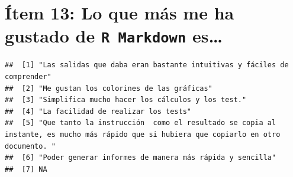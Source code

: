 \documentclass[
]{article}
\newenvironment{Shaded}{\begin{snugshade}}{\end{snugshade}}
\newcommand{\CommentTok}[1]{\textcolor[rgb]{0.56,0.35,0.01}{\textit{#1}}}
\newcommand{\NormalTok}[1]{#1}
\newcommand{\SpecialCharTok}[1]{\textcolor[rgb]{0.81,0.36,0.00}{\textbf{#1}}}
\begin{document}
\hypertarget{uxedtem-13-lo-que-muxe1s-me-ha-gustado-de-es}{%
\section{\texorpdfstring{Ítem 13: Lo que más me ha gustado de
\texttt{R Markdown}
es\ldots{}}{Ítem 13: Lo que más me ha gustado de  es\ldots{}}}\label{uxedtem-13-lo-que-muxe1s-me-ha-gustado-de-es}}

\begin{Shaded}
\end{Shaded}

\begin{verbatim}
##  [1] "Las salidas que daba eran bastante intuitivas y fáciles de comprender"                                                                                                                                                                                                      
##  [2] "Me gustan los colorines de las gráficas"                                                                                                                                                                                                                                    
##  [3] "Simplifica mucho hacer los cálculos y los test."                                                                                                                                                                                                                            
##  [4] "La facilidad de realizar los tests"                                                                                                                                                                                                                                         
##  [5] "Que tanto la instrucción  como el resultado se copia al instante, es mucho más rápido que si hubiera que copiarlo en otro documento. "                                                                                                                                      
##  [6] "Poder generar informes de manera más rápida y sencilla"                                                                                                                                                                                                                     
##  [7] NA                                                                                                                                                                                                                                                                           

\end{verbatim}
\end{document}
